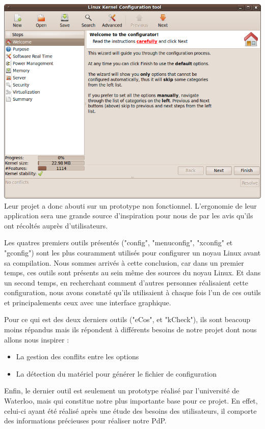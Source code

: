 \documentclass[16pts]{report}
\begin{document}
\includegraphics[scale=0.6]{illustrations/lkc-config.png} \\

Leur projet a donc abouti sur un prototype non fonctionnel.
    L’ergonomie de leur application sera une grande source d’inspiration
    pour nous de par les avis qu’ils ont récoltés auprès d’utilisateurs.

Les quatres premiers outils présentés ("config", "menuconfig", "xconfig" et
"gconfig") sont les plus couramment utilisés pour configurer un noyau Linux
avant sa compilation. Nous sommes arrivés à cette conclusion, car dans un
premier temps, ces outils sont présents au sein même des sources du noyau Linux.
Et dans un second temps, en recherchant comment d'autres personnes réalisaient
cette configuration, nous avons constaté qu'ils utilisaient à chaque fois l'un
de ces outils et principalements ceux avec une interface graphique.

Pour ce qui est des deux derniers outils ("eCos", et "kCheck"), ils sont
beacoup moins répandus mais ils répondent à différents besoins de notre projet
dont nous allons nous inspirer :
\begin{itemize}
    \item La gestion des conflits entre les options
    \item La détection du matériel pour générer le fichier de configuration
\end{itemize}

Enfin, le dernier outil est seulement un prototype réalisé par l'université de
Waterloo, mais qui constitue notre plus importante base pour ce projet. En
effet, celui-ci ayant été réalisé après une étude des besoins des utilisateurs,
il comporte des informations précieuses pour réaliser notre PdP.
\end{document}
